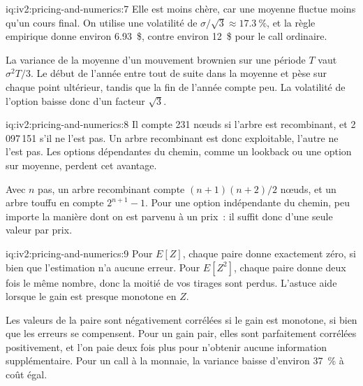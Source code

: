 \begin{solution}{iq:iv2:pricing-and-numerics:7}
Elle est moins chère, car une moyenne fluctue moins qu'un cours final. On utilise une volatilité de $\sigma/\sqrt 3 \approx 17.3~\%$, et la règle empirique donne environ 6.93~\$, contre environ 12~\$ pour le call ordinaire.

La variance de la moyenne d'un mouvement brownien sur une période $T$ vaut $\sigma^2T/3$. Le début de l'année entre tout de suite dans la moyenne et pèse sur chaque point ultérieur, tandis que la fin de l'année compte peu. La volatilité de l'option baisse donc d'un facteur $\sqrt 3$.

\end{solution}

\begin{solution}{iq:iv2:pricing-and-numerics:8}
Il compte 231 nœuds si l'arbre est recombinant, et 2\,097\,151 s'il ne l'est pas. Un arbre recombinant est donc exploitable, l'autre ne l'est pas. Les options dépendantes du chemin, comme un lookback ou une option sur moyenne, perdent cet avantage.

Avec $n$ pas, un arbre recombinant compte $(n + 1)(n + 2)/2$ nœuds, et un arbre touffu en compte $2^{n+1} - 1$. Pour une option indépendante du chemin, peu importe la manière dont on est parvenu à un prix~: il suffit donc d'une seule valeur par prix.

\end{solution}

\begin{solution}{iq:iv2:pricing-and-numerics:9}
Pour $E[Z]$, chaque paire donne exactement zéro, si bien que l'estimation n'a aucune erreur. Pour $E[Z^2]$, chaque paire donne deux fois le même nombre, donc la moitié de vos tirages sont perdus. L'astuce aide lorsque le gain est presque monotone en $Z$.

Les valeurs de la paire sont négativement corrélées si le gain est monotone, si bien que les erreurs se compensent. Pour un gain pair, elles sont parfaitement corrélées positivement, et l'on paie deux fois plus pour n'obtenir aucune information supplémentaire. Pour un call à la monnaie, la variance baisse d'environ 37~\% à coût égal.

\end{solution}

